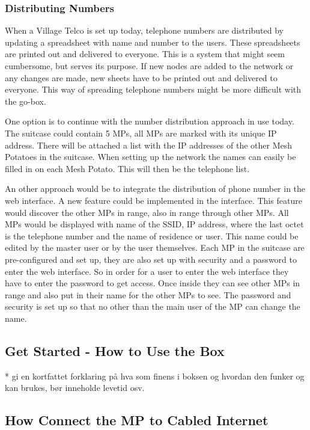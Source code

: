 \subsubsection{Distributing Numbers}
When a Village Telco is set up today, telephone numbers are distributed by updating a spreadsheet with name and number to the users. These spreadsheets are printed out and delivered to everyone. This is a system that might seem cumbersome, but serves its purpose. If new nodes are added to the network or any changes are made, new sheets have to be printed out and delivered to everyone. This way of spreading telephone numbers might be more difficult with the go-box. 

One option is to continue with the number distribution approach in use today. The suitcase could contain 5 MPs, all MPs are marked with its unique IP address. There will be attached a list with the IP addresses of the other Mesh Potatoes in the suitcase. When setting up the network the names can easily be filled in on each Mesh Potato. This will then be the telephone list.  

An other approach would be to integrate the distribution of phone number in the web interface. A new feature could be implemented in the interface. This feature would discover the other MPs in range, also in range through other MPs. All MPs would be displayed with name of the SSID, IP address, where the last octet is the telephone number and the name of residence or user. This name could be edited by the master user or by the user themselves. Each MP in the suitcase are pre-configured and set up, they are also set up with security and a password to enter the web interface. So in order for a user to enter the web interface they have to enter the password to get access. Once inside they can see other MPs in range and also put in their name for the other MPs to see. The password and security is set up so that no other than the main user of the MP can change the name. 


\subsection{Get Started - How to Use the Box}
* gi en kortfattet forklaring på hva som finens i boksen og hvordan den funker og kan brukes, bør inneholde levetid osv.


\subsection{How Connect the MP to Cabled Internet}


